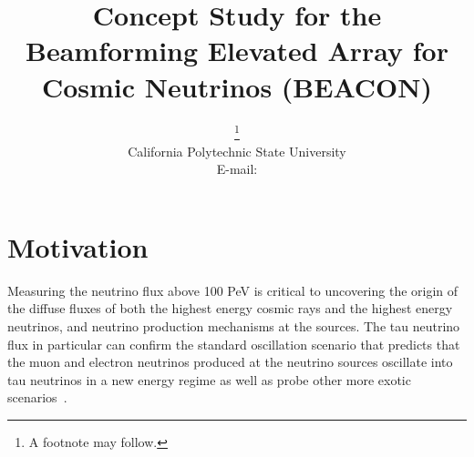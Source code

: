 \documentclass{PoS}
\title{Concept Study for the Beamforming Elevated Array for Cosmic Neutrinos (BEACON)}
\author{\speaker{Stephanie Wissel}\thanks{A footnote may follow.}\\
        California Polytechnic State University\\
        E-mail: \email{swissel@calpoly.edu}}
\begin{document}
\section{Motivation}

Measuring the neutrino flux above 100 PeV is critical to uncovering the origin of the diffuse fluxes of both the highest energy cosmic rays and the highest energy neutrinos, and neutrino production mechanisms at the sources. The tau neutrino flux in particular can confirm the standard oscillation scenario that predicts that the muon and electron neutrinos produced at the neutrino sources oscillate into tau neutrinos in a new energy regime as well as probe other more exotic scenarios~\cite{Astro2020_fundamental}. 
\end{document}
